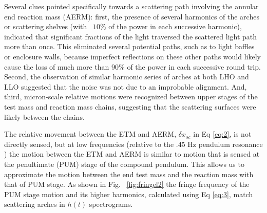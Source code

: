 \documentclass[12pt]{iopart}
\begin{document}

 
Several clues pointed specifically towards a scattering path involving the annular end reaction mass (AERM): first, the presence of several harmonics of the arches or scattering shelves (with ~$10\%$ of the power in each successive harmonic), indicated that significant fractions of the light traversed the scattered light path more than once. This eliminated several potential paths, such as to light baffles or enclosure walls, because imperfect reflections on these other paths would likely cause the loss of much more than $90\%$ of the power in each successive round trip. Second, the observation of similar harmonic series of arches at both LHO and LLO suggested that the noise was not due to an improbable alignment. And, third, micron-scale relative motions were recognized between upper stages of the test mass and reaction mass chains, suggesting that the scattering surfaces were likely between the chains. %
 
The relative movement between the ETM and AERM, ${\delta x_{sc}}$ in Eq \ref{eq:2}, is not directly sensed, but at low frequencies (relative to the $.45$ Hz pendulum resonance ) the motion between the ETM and AERM is similar to motion that is sensed at the penultimate (PUM) stage of the compound pendulum. This allows us to approximate the motion between the end test mass and the reaction mass with that of PUM stage.  As shown in Fig. ~\ref{fig:fringel2} the fringe frequency of the PUM stage motion and its higher harmonics, calculated using Eq \ref{eq:3}, match scattering arches in $h(t)$ spectrograms.

\end{document}
